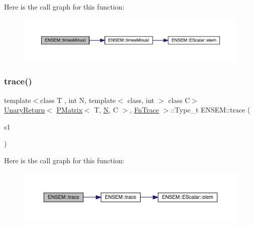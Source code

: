 Here is the call graph for this function\+:\nopagebreak
\begin{figure}[H]
\begin{center}
\leavevmode
\includegraphics[width=350pt]{df/d0a/group__primmatrix_ga937a4152dd7d0ceaec303ddbdbaf5a98_cgraph}
\end{center}
\end{figure}
\mbox{\label{group__primmatrix_gafc761796f6ca23ee43cd937f3459e3ce}} 
\subsubsection{\texorpdfstring{trace()}{trace()}}
{\footnotesize\ttfamily template$<$class T , int N, template$<$ class, int $>$ class C$>$ \\
\mbox{\hyperlink{structENSEM_1_1UnaryReturn}{Unary\+Return}}$<$ \mbox{\hyperlink{classENSEM_1_1PMatrix}{P\+Matrix}}$<$ T, \mbox{\hyperlink{adat__devel_2lib_2hadron_2operator__name__util_8cc_a7722c8ecbb62d99aee7ce68b1752f337}{N}}, C $>$, \mbox{\hyperlink{structENSEM_1_1FnTrace}{Fn\+Trace}} $>$\+::Type\+\_\+t E\+N\+S\+E\+M\+::trace (\begin{DoxyParamCaption}\item[{const \mbox{\hyperlink{classENSEM_1_1PMatrix}{P\+Matrix}}$<$ T, \mbox{\hyperlink{adat__devel_2lib_2hadron_2operator__name__util_8cc_a7722c8ecbb62d99aee7ce68b1752f337}{N}}, C $>$ \&}]{s1 }\end{DoxyParamCaption})\hspace{0.3cm}{\ttfamily [inline]}}

Here is the call graph for this function\+:\nopagebreak
\begin{figure}[H]
\begin{center}
\leavevmode
\includegraphics[width=350pt]{df/d0a/group__primmatrix_gafc761796f6ca23ee43cd937f3459e3ce_cgraph}
\end{center}
\end{figure}
\mbox{\label{group__primmatrix_ga1d05c45afa351dba712d9d083a013d41}} 
